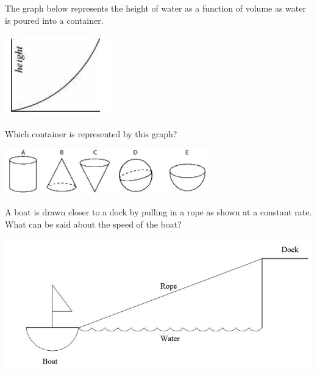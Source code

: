 \documentclass{ximera}
\newcommand{\recommendation}[1]{}
\newcommand{\GoodQuestions}[1]{}
\newcommand{\PCA}[1]{}
\begin{document}
\begin{problem}
  \recommendation{Elizabeth}
  \PCA{\#15}
  
  The graph below represents the height of water as a function of
  volume as water is poured into a container.
  \begin{image}
    \includegraphics[scale = 1]{height.jpg}
  \end{image}
  Which container is represented by this graph?
  \begin{image}
  \includegraphics[width=3.5in]{shapes.jpg}  
  \end{image}
  \begin{multipleChoice}
  \end{multipleChoice}

\end{problem}


  



\begin{problem}
  \recommendation{Elizabeth}
  \GoodQuestions{Subject: Related Rates 2P}
  A boat is drawn closer to a dock by pulling in a rope as shown at a
  constant rate.  What can be said about the speed of the boat?
  \begin{image}
    \includegraphics[scale=.7]{boat.jpg}
  \end{image}
  \begin{multipleChoice}
  \end{multipleChoice}
\end{problem}
\end{document}
